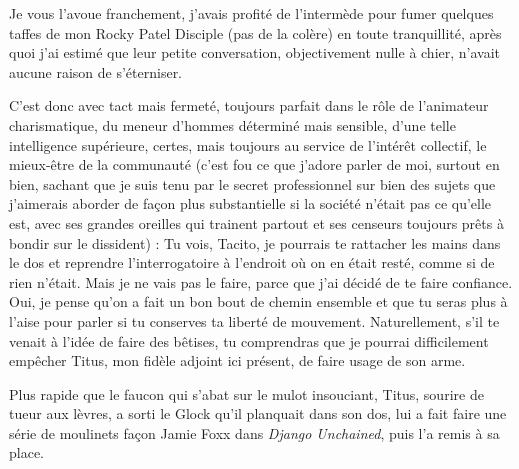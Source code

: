 Je vous l’avoue franchement, j’avais profité de l’intermède pour fumer quelques taffes de mon Rocky Patel Disciple (pas de la colère) en toute tranquillité, après quoi j’ai estimé que leur petite conversation, objectivement nulle à chier, n’avait aucune raison de s’éterniser.

C’est donc avec tact mais fermeté, toujours parfait dans le rôle de l’animateur charismatique, du meneur d’hommes déterminé mais sensible, d’une telle intelligence supérieure, certes, mais toujours au service de l’intérêt collectif, le mieux-être de la communauté (c’est fou ce que j’adore parler de moi, surtout en bien, sachant que je suis tenu par le secret professionnel sur bien des sujets que j’aimerais aborder de façon plus substantielle si la société n’était pas ce qu’elle est, avec ses grandes oreilles qui trainent partout et ses censeurs toujours prêts à bondir sur le dissident) : Tu vois, Tacito, je pourrais te rattacher les mains dans le dos et reprendre l’interrogatoire à l’endroit où on en était resté, comme si de rien n’était. Mais je ne vais pas le faire, parce que j’ai décidé de te faire confiance. Oui, je pense qu’on a fait un bon bout de chemin ensemble et que tu seras plus à l’aise pour parler si tu conserves ta liberté de mouvement. Naturellement, s’il te venait à l’idée de faire des bêtises, tu comprendras que je pourrai difficilement empêcher Titus, mon fidèle adjoint ici présent, de faire usage de son arme.

%
%
%
Plus rapide que le faucon qui s’abat sur le mulot insouciant, Titus, sourire de tueur aux lèvres, a sorti le Glock qu’il planquait dans son dos, lui a fait faire une série de moulinets façon Jamie Foxx dans \textit{Django Unchained}, puis l’a remis à sa place.

